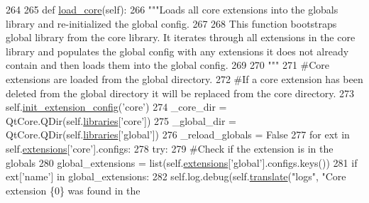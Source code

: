 \begin{DoxyCode}
264 
265     \textcolor{keyword}{def }\hyperlink{classcommotion__client_1_1utils_1_1extension__manager_1_1ExtensionManager_a98f5f3c261f083885a9b0528dcdafd34}{load\_core}(self):
266         \textcolor{stringliteral}{"""Loads all core extensions into the globals library and re-initialized the global config.}
267 \textcolor{stringliteral}{        }
268 \textcolor{stringliteral}{        This function bootstraps global library from the core library. It iterates through all extensions
       in the core library and populates the global config with any extensions it does not already contain and then
       loads them into the global config.}
269 \textcolor{stringliteral}{}
270 \textcolor{stringliteral}{        """}
271         \textcolor{comment}{#Core extensions are loaded from the global directory.}
272         \textcolor{comment}{#If a core extension has been deleted from the global directory it will be replaced from the core
       directory.}
273         self.\hyperlink{classcommotion__client_1_1utils_1_1extension__manager_1_1ExtensionManager_ae751a1b407e33af012d41ec44f2ce717}{init\_extension\_config}(\textcolor{stringliteral}{'core'})
274         \_core\_dir = QtCore.QDir(self.\hyperlink{classcommotion__client_1_1utils_1_1extension__manager_1_1ExtensionManager_a28e035496b4d544179f934b3c401c0c1}{libraries}[\textcolor{stringliteral}{'core'}])
275         \_global\_dir = QtCore.QDir(self.\hyperlink{classcommotion__client_1_1utils_1_1extension__manager_1_1ExtensionManager_a28e035496b4d544179f934b3c401c0c1}{libraries}[\textcolor{stringliteral}{'global'}])
276         \_reload\_globals = \textcolor{keyword}{False}
277         \textcolor{keywordflow}{for} ext \textcolor{keywordflow}{in} self.\hyperlink{classcommotion__client_1_1utils_1_1extension__manager_1_1ExtensionManager_ab11d3e09be6db88eb58e432c82d82702}{extensions}[\textcolor{stringliteral}{'core'}].configs:
278             \textcolor{keywordflow}{try}:
279                 \textcolor{comment}{#Check if the extension is in the globals}
280                 global\_extensions = list(self.\hyperlink{classcommotion__client_1_1utils_1_1extension__manager_1_1ExtensionManager_ab11d3e09be6db88eb58e432c82d82702}{extensions}[\textcolor{stringliteral}{'global'}].configs.keys())
281                 \textcolor{keywordflow}{if} ext[\textcolor{stringliteral}{'name'}] \textcolor{keywordflow}{in} global\_extensions:
282                     self.log.debug(self.\hyperlink{classcommotion__client_1_1utils_1_1extension__manager_1_1ExtensionManager_a2cfd032ca383c3fd6f0f52b99b6dd67c}{translate}(\textcolor{stringliteral}{"logs"}, \textcolor{stringliteral}{"Core extension \{0\} was found in the
}
\end{DoxyCode}
